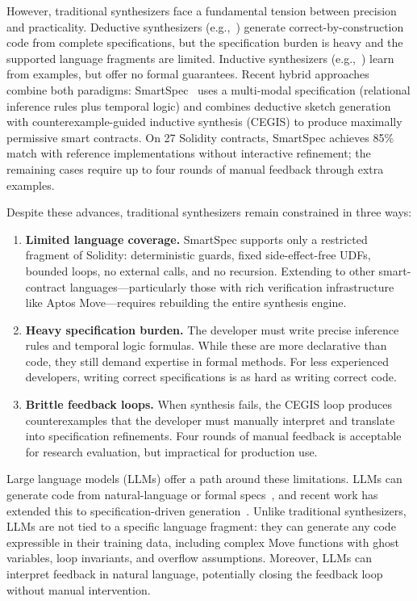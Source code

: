 \documentclass[conference]{IEEEtran}
\begin{document}
However, traditional synthesizers face a fundamental tension between precision and practicality. Deductive synthesizers (e.g.,~\cite{alur2013syntax,gulwani2011automating}) generate correct-by-construction code from complete specifications, but the specification burden is heavy and the supported language fragments are limited. Inductive synthesizers (e.g.,~\cite{gulwani2011automating,le2017s3}) learn from examples, but offer no formal guarantees. Recent hybrid approaches combine both paradigms: SmartSpec~\cite{smartspec} uses a multi-modal specification (relational inference rules plus temporal logic) and combines deductive sketch generation with counterexample-guided inductive synthesis (CEGIS) to produce maximally permissive smart contracts. On 27 Solidity contracts, SmartSpec achieves 85\% match with reference implementations without interactive refinement; the remaining cases require up to four rounds of manual feedback through extra examples.

Despite these advances, traditional synthesizers remain constrained in three ways:

\begin{enumerate}
\item \textbf{Limited language coverage.} SmartSpec supports only a restricted fragment of Solidity: deterministic guards, fixed side-effect-free UDFs, bounded loops, no external calls, and no recursion. Extending to other smart-contract languages---particularly those with rich verification infrastructure like Aptos Move---requires rebuilding the entire synthesis engine.
\item \textbf{Heavy specification burden.} The developer must write precise inference rules and temporal logic formulas. While these are more declarative than code, they still demand expertise in formal methods. For less experienced developers, writing correct specifications is as hard as writing correct code.
\item \textbf{Brittle feedback loops.} When synthesis fails, the CEGIS loop produces counterexamples that the developer must manually interpret and translate into specification refinements. Four rounds of manual feedback is acceptable for research evaluation, but impractical for production use.
\end{enumerate}

Large language models (LLMs) offer a path around these limitations. LLMs can generate code from natural-language or formal specs~\cite{chen2021evaluating,austin2021program,liu2026sysspec,le2022coderl}, and recent work has extended this to specification-driven generation~\cite{zhang2025msg}. Unlike traditional synthesizers, LLMs are not tied to a specific language fragment: they can generate any code expressible in their training data, including complex Move functions with ghost variables, loop invariants, and overflow assumptions. Moreover, LLMs can interpret feedback in natural language, potentially closing the feedback loop without manual intervention.
\end{document}
